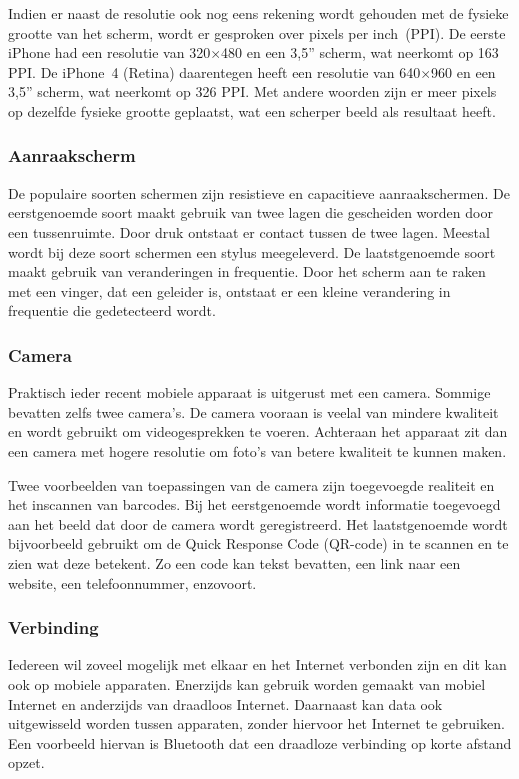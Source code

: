 Indien er naast de resolutie ook nog eens rekening wordt gehouden met de fysieke grootte van het scherm, wordt er gesproken over pixels per inch~(PPI). 
De eerste iPhone had een resolutie van 320$\times$480 en een 3,5” scherm, wat neerkomt op 163 PPI. 
De iPhone~4 (Retina) daarentegen heeft een resolutie van 640$\times$960 en een 3,5” scherm, wat neerkomt op 326 PPI. 
Met andere woorden zijn er meer pixels op dezelfde fysieke grootte geplaatst, wat een scherper beeld als resultaat heeft. 

\subsubsection{Aanraakscherm}
De populaire soorten schermen zijn resistieve en capacitieve aanraakschermen. 
De eerstgenoemde soort maakt gebruik van twee lagen die gescheiden worden door een tussenruimte. 
Door druk ontstaat er contact tussen de twee lagen. 
Meestal wordt bij deze soort schermen een stylus meegeleverd. 
De laatstgenoemde soort maakt gebruik van veranderingen in frequentie. 
Door het scherm aan te raken met een vinger, dat een geleider is, ontstaat er een kleine verandering in frequentie die gedetecteerd wordt. 

\subsubsection{Camera}
Praktisch ieder recent mobiele apparaat is uitgerust met een camera. 
Sommige bevatten zelfs twee camera's. 
De camera vooraan is veelal van mindere kwaliteit en wordt gebruikt om videogesprekken te voeren. 
Achteraan het apparaat zit dan een camera met hogere resolutie om foto's van betere kwaliteit te kunnen maken.

Twee voorbeelden van toepassingen van de camera zijn toegevoegde realiteit en het inscannen van barcodes.
Bij het eerstgenoemde wordt informatie toegevoegd aan het beeld dat door de camera wordt geregistreerd.
Het laatstgenoemde wordt bijvoorbeeld gebruikt om de Quick Response Code (QR-code) in te scannen en te zien wat deze betekent.
Zo een code kan tekst bevatten, een link naar een website, een telefoonnummer, enzovoort. 

\subsubsection{Verbinding}
Iedereen wil zoveel mogelijk met elkaar en het Internet verbonden zijn en dit kan ook op mobiele apparaten. 
Enerzijds kan gebruik worden gemaakt van mobiel Internet en anderzijds van draadloos Internet.
Daarnaast kan data ook uitgewisseld worden tussen apparaten, zonder hiervoor het Internet te gebruiken.
Een voorbeeld hiervan is Bluetooth dat een draadloze verbinding op korte afstand opzet.

